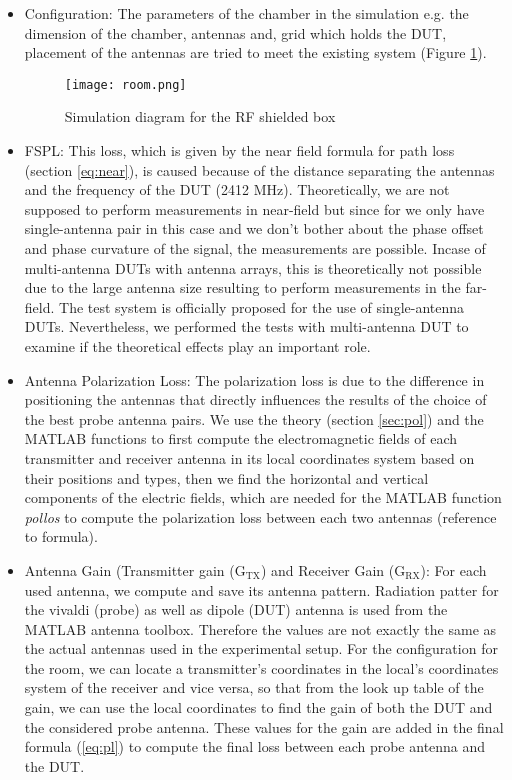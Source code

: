\begin{itemize}
  \item Configuration: The parameters of the chamber in the simulation e.g. the dimension of the chamber, antennas and, grid which holds the \acs{DUT}, placement of the antennas are tried to meet the existing system (Figure \ref{fig:room}). 
  \begin{figure}[H]
\centering
\texttt{[image: room.png]}
\caption{Simulation diagram for the \acs{RF} shielded box}
\label{fig:room} 
\end{figure}

  \item \acf{FSPL}: This loss, which is given by the near field formula for path loss (section \ref{eq:near}), is caused because of the distance separating the antennas and the frequency of the \acs{DUT} (2412 MHz). Theoretically, we are not supposed to perform measurements in near-field but since for we only have single-antenna pair in this case and we don't bother about the phase offset and phase curvature of the signal, the measurements are possible. Incase of multi-antenna \acsp{DUT} with antenna arrays, this is theoretically not possible due to the large antenna size resulting to perform measurements in the far-field. The test system is officially proposed for the use of single-antenna \acsp{DUT}. Nevertheless, we performed the tests with multi-antenna \acs{DUT} to examine if the theoretical effects play an important role.
 
  \item Antenna Polarization Loss: The polarization loss is due to the difference in positioning the antennas that directly influences the results of the choice of the best probe antenna pairs. We use the theory (section \ref{sec:pol}) and the MATLAB\textregistered{} functions to first compute the electromagnetic fields of each transmitter and receiver antenna in its local coordinates system based on their positions and types, then we find the horizontal and vertical components of the electric fields, which are needed for the MATLAB\textregistered{} function \textit{pollos} to compute the polarization loss between each two antennas (reference to formula).
  
  \item Antenna Gain (Transmitter gain ($\mbox{G}_{\mbox{TX}}$) and Receiver Gain ($\mbox{G}_{\mbox{RX}}$): For each used antenna, we compute and save its antenna pattern. Radiation patter for the vivaldi (probe) as well as dipole (\acs{DUT}) antenna is used from the MATLAB\textregistered{} antenna toolbox. Therefore the values are not exactly the same as the actual antennas used in the experimental setup. For the configuration for the room, we can locate a transmitter's coordinates in the local's coordinates system of the receiver and vice versa, so that from the look up table of the gain, we can use the local coordinates to find the gain of both the \acs{DUT} and the considered probe antenna. These values for the gain are added in the final formula  (\ref{eq:pl}) to compute the final loss between each probe antenna and the \acs{DUT}.
  

\end{itemize}
